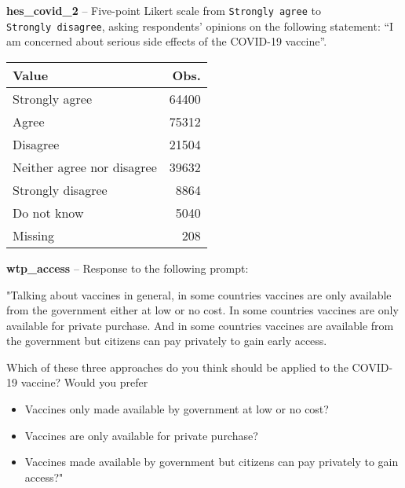 \documentclass[
]{article}
\providecommand{\tightlist}{%
  \setlength{\itemsep}{0pt}\setlength{\parskip}{0pt}}
\begin{document}
\textbf{hes\_covid\_2} -- Five-point Likert scale from
\texttt{Strongly\ agree} to \texttt{Strongly\ disagree}, asking
respondents' opinions on the following statement: ``I am concerned about
serious side effects of the COVID-19 vaccine''.

\begin{longtable}[]{@{}lr@{}}
\toprule
Value & Obs.\tabularnewline
\midrule
\endhead
Strongly agree & 64400\tabularnewline
Agree & 75312\tabularnewline
Disagree & 21504\tabularnewline
Neither agree nor disagree & 39632\tabularnewline
Strongly disagree & 8864\tabularnewline
Do not know & 5040\tabularnewline
Missing & 208\tabularnewline
\bottomrule
\end{longtable}

\textbf{wtp\_access} -- Response to the following prompt:

"Talking about vaccines in general, in some countries vaccines are only
available from the government either at low or no cost. In some
countries vaccines are only available for private purchase. And in some
countries vaccines are available from the government but citizens can
pay privately to gain early access.

Which of these three approaches do you think should be applied to the
COVID-19 vaccine? Would you prefer

\begin{itemize}
\tightlist
\item
  Vaccines only made available by government at low or no cost?
\item
  Vaccines are only available for private purchase?
\item
  Vaccines made available by government but citizens can pay privately
  to gain access?"
\end{itemize}
\end{document}
